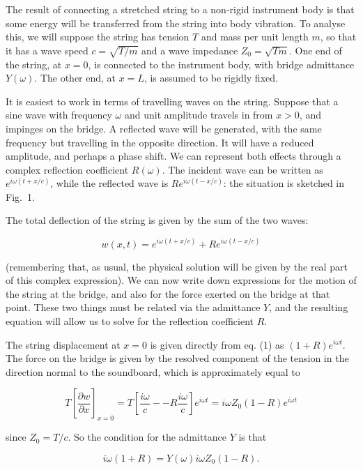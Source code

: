   The result of connecting a stretched string to a non-rigid instrument body is 
  that some energy will be transferred from the string into body vibration. To 
  analyse this, we will suppose the string has tension $T$ and mass per unit 
  length $m$, so that it has a wave speed $c=\sqrt{T/m}$ and a wave impedance 
  $Z_0=\sqrt{Tm}$. One end of the string, at $x=0$, is connected to the 
  instrument body, with bridge admittance $Y(\omega)$. The other end, at $x=L$, 
  is assumed to be rigidly fixed. 

  It is easiest to work in terms of travelling waves on the string. Suppose 
  that a sine wave with frequency $\omega$ and unit amplitude travels in from 
  $x>0$, and impinges on the bridge. A reflected wave will be generated, with 
  the same frequency but travelling in the opposite direction. It will have a 
  reduced amplitude, and perhaps a phase shift. We can represent both effects 
  through a complex reflection coefficient $R(\omega)$. The incident wave can 
  be written as $e^{i \omega(t+x/c)}$, while the reflected wave is $R e^{i 
  \omega (t-x/c)}$: the situation is sketched in Fig.\ 1. 

  The total deflection of the string is given by the sum of the two waves: 

  $$w(x,t)=e^{i \omega(t+x/c)}+R e^{i \omega (t-x/c)} \tag{1}$$ 

  (remembering that, as usual, the physical solution will be given by the real 
  part of this complex expression). We can now write down expressions for the 
  motion of the string at the bridge, and also for the force exerted on the 
  bridge at that point. These two things must be related via the admittance 
  $Y$, and the resulting equation will allow us to solve for the reflection 
  coefficient $R$. 

  The string displacement at $x=0$ is given directly from eq. (1) as $(1+R)e^{i 
  \omega t}$. The force on the bridge is given by the resolved component of the 
  tension in the direction normal to the soundboard, which is approximately 
  equal to 

  $$T \left[ \dfrac{\partial w}{\partial x} \right]_{x=0} = T \left[ \dfrac{i 
  \omega}{c} -- R \dfrac{i \omega}{c} \right] e^{i \omega t} = i \omega Z_0 
  (1-R) e^{i \omega t}\tag{2}$$ 

  since $Z_0=T/c$. So the condition for the admittance $Y$ is that 

  $$i \omega (1+R) = Y(\omega) i \omega Z_0 (1-R) .\tag{3}$$ 


